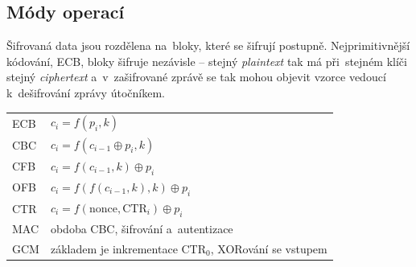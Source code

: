 \subsection{Módy operací}

Šifrovaná data jsou rozdělena na~bloky, které se šifrují postupně. Nejprimitivnější kódování, ECB, bloky šifruje nezávisle -- stejný \emph{plaintext} tak má při~stejném klíči stejný \emph{ciphertext} a~v~zašifrované zprávě se tak mohou objevit vzorce vedoucí k~dešifrování zprávy útočníkem.

\begin{table}[ht]
\centering
\begin{tabular}{p{1cm}|p{14cm}}
ECB & $c_i = f(p_i, k)$ \\
CBC & $c_i = f(c_{i-1} \oplus p_i, k)$ \\
CFB & $c_i = f(c_{i-1}, k) \oplus p_i$ \\
OFB & $c_i = f(f(c_{i-1}, k), k) \oplus p_i$ \\
CTR & $c_i = f(\mathrm{nonce}, \mathrm{CTR}_i) \oplus p_i$ \\
MAC & obdoba CBC, šifrování a~autentizace \\
GCM & základem je inkrementace CTR$_0$, XORování se vstupem \\
\end{tabular}
\end{table}

